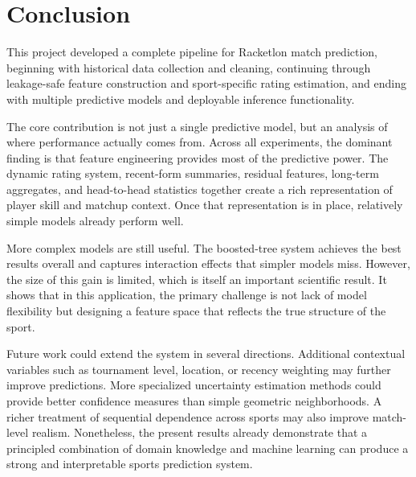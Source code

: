 \documentclass[10pt,twocolumn]{article}
\begin{document}
\section{Conclusion}

This project developed a complete pipeline for Racketlon match prediction, beginning with historical data collection and cleaning, continuing through leakage-safe feature construction and sport-specific rating estimation, and ending with multiple predictive models and deployable inference functionality.

The core contribution is not just a single predictive model, but an analysis of where performance actually comes from. Across all experiments, the dominant finding is that feature engineering provides most of the predictive power. The dynamic rating system, recent-form summaries, residual features, long-term aggregates, and head-to-head statistics together create a rich representation of player skill and matchup context. Once that representation is in place, relatively simple models already perform well.

More complex models are still useful. The boosted-tree system achieves the best results overall and captures interaction effects that simpler models miss. However, the size of this gain is limited, which is itself an important scientific result. It shows that in this application, the primary challenge is not lack of model flexibility but designing a feature space that reflects the true structure of the sport.

Future work could extend the system in several directions. Additional contextual variables such as tournament level, location, or recency weighting may further improve predictions. More specialized uncertainty estimation methods could provide better confidence measures than simple geometric neighborhoods. A richer treatment of sequential dependence across sports may also improve match-level realism. Nonetheless, the present results already demonstrate that a principled combination of domain knowledge and machine learning can produce a strong and interpretable sports prediction system.
\end{document}
